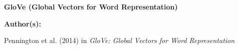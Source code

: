 


\begin{frame}{}
    \begin{center}
        \large \textbf{GloVe (Global Vectors for Word Representation)}
    \end{center}
    \vspace{20pt}
    
    \textbf{Author(s):}
    \begin{itemizeSpaced}{5pt}
    {\color{DimGrey} 
        \item Pennington et al. (2014) in \emph{GloVe: Global Vectors for Word Representation}
        
    }
    \end{itemizeSpaced}
\end{frame}




